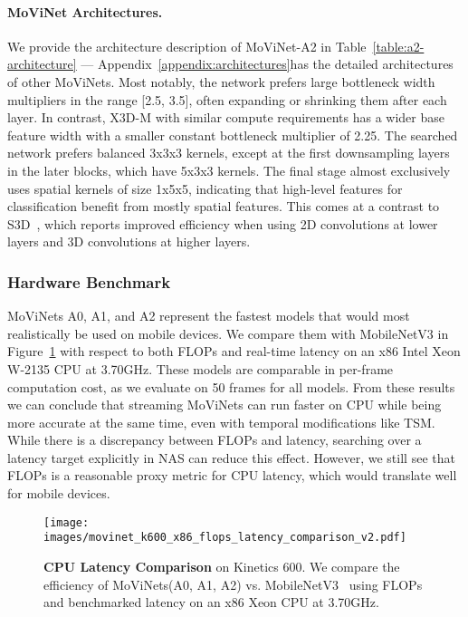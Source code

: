 \documentclass[final]{cvpr}
\newcommand{\ournet}{MoViNet\xspace} \newcommand{\ournets}{\ournet{}s\xspace}
\newcommand{\appendixarchitectures}{\ref{appendix:architectures}}
\begin{document}
\vspace{-10pt}
\paragraph{\ournet Architectures.}
We provide the architecture description of \ournet-A2 in Table~\ref{table:a2-architecture} --- Appendix~\appendixarchitectures has the detailed architectures of other \ournets.
Most notably, the network prefers large bottleneck width multipliers in the range [2.5, 3.5], often expanding or shrinking them after each layer.
In contrast, X3D-M with similar compute requirements has a wider base feature width with a smaller constant bottleneck multiplier of 2.25.
The searched network prefers balanced 3x3x3 kernels, except at the first downsampling layers in the later blocks, which have 5x3x3 kernels.
The final stage almost exclusively uses spatial kernels of size 1x5x5, indicating that high-level features for classification benefit from mostly spatial features.
This comes at a contrast to S3D~\cite{xie2018rethinking}, which reports improved efficiency when using 2D convolutions at lower layers and 3D convolutions at higher layers.




\vspace{-10pt}
\subsubsection{Hardware Benchmark}

\ournets A0, A1, and A2 represent the fastest models that would most realistically be used on mobile devices.
We compare them with MobileNetV3 in Figure~\ref{fig:x86-comparison} with respect to both FLOPs and real-time latency on an x86 Intel Xeon W-2135 CPU at 3.70GHz.
These models are comparable in per-frame computation cost, as we evaluate on 50 frames for all models.
From these results we can conclude that streaming \ournets can run faster on CPU while being more accurate at the same time, even with temporal modifications like TSM.
While there is a discrepancy between FLOPs and latency, searching over a latency target explicitly in NAS can reduce this effect.
However, we still see that FLOPs is a reasonable proxy metric for CPU latency, which would translate well for mobile devices.


\begin{figure}[t]
    \centering
    \texttt{[image: images/movinet\_k600\_x86\_flops\_latency\_comparison\_v2.pdf]}
    \caption{
        {\bf CPU Latency Comparison} on Kinetics 600.
        We compare the efficiency of \ournets  (A0, A1, A2) vs. MobileNetV3~\cite{howard2019searching} using FLOPs and benchmarked latency on an x86 Xeon CPU at 3.70GHz.
    }
    \label{fig:x86-comparison}
\end{figure}
\end{document}
